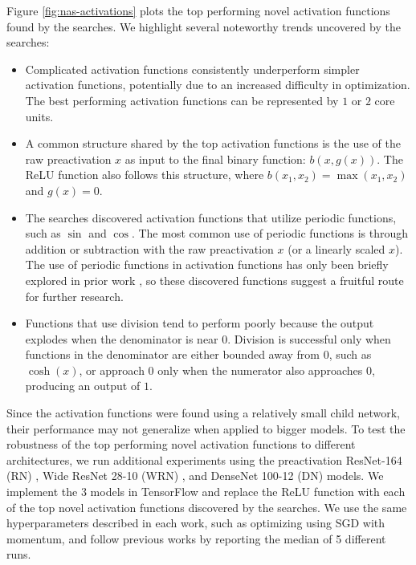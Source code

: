 \documentclass{article} %
\begin{document}
Figure \ref{fig:nas-activations} plots the top performing novel activation functions found by the searches. We highlight several noteworthy trends uncovered by the searches:
\begin{itemize}
    \item Complicated activation functions consistently underperform simpler activation functions, potentially due to an increased difficulty in optimization. The best performing activation functions can be represented by $1$ or $2$ core units.
    \item A common structure shared by the top activation functions is the use of the raw preactivation $x$ as input to the final binary function: $b(x, g(x))$. The ReLU function also follows this structure, where $b(x_1, x_2) = \max(x_1, x_2)$ and $g(x) = 0$.
    \item The searches discovered activation functions that utilize periodic functions, such as $\sin$ and $\cos$. The most common use of periodic functions is through addition or subtraction with the raw preactivation $x$ (or a linearly scaled $x$). The use of periodic functions in activation functions has only been briefly explored in prior work \citep{parascandolo2016taming}, so these discovered functions suggest a fruitful route for further research.
    \item Functions that use division tend to perform poorly because the output explodes when the denominator is near $0$. Division is successful only when functions in the denominator are either bounded away from $0$, such as $\cosh(x)$, or approach $0$ only when the numerator also approaches $0$, producing an output of $1$. 
\end{itemize}

Since the activation functions were found using a relatively small child network, their performance may not generalize when applied to bigger models. To test the robustness of the top performing novel activation functions to different architectures, we run additional experiments using the preactivation ResNet-164 (RN) \citep{he2016identity}, Wide ResNet 28-10 (WRN) \citep{zagoruyko2016wide}, and DenseNet 100-12 (DN) \citep{huang2016densely} models. We implement the 3 models in TensorFlow and replace the ReLU function with each of the top novel activation functions discovered by the searches. We use the same hyperparameters described in each work, such as optimizing using SGD with momentum, and follow previous works by reporting the median of 5 different runs.
\end{document}
